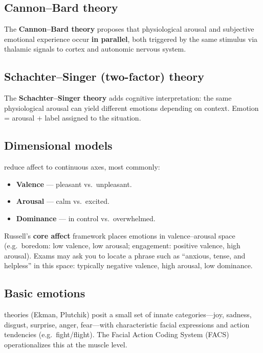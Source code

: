 
\subsection{Cannon--Bard theory}

The \textbf{Cannon--Bard theory} proposes that physiological arousal and subjective emotional experience occur \textbf{in parallel}, both triggered by the same stimulus via thalamic signals to cortex and autonomic nervous system.

\subsection{Schachter--Singer (two-factor) theory}

The \textbf{Schachter--Singer theory} adds cognitive interpretation: the same physiological arousal can yield different emotions depending on context. Emotion = arousal + label assigned to the situation.

\subsection{Dimensional models}

 reduce affect to continuous axes, most commonly:
\begin{itemize}
  \item \textbf{Valence} --- pleasant vs.\ unpleasant.
  \item \textbf{Arousal} --- calm vs.\ excited.
  \item \textbf{Dominance} --- in control vs.\ overwhelmed.
\end{itemize}

Russell's \textbf{core affect} framework places emotions in valence--arousal space (e.g.\ boredom: low valence, low arousal; engagement: positive valence, high arousal). Exams may ask you to locate a phrase such as ``anxious, tense, and helpless'' in this space: typically negative valence, high arousal, low dominance.

\subsection{Basic emotions}

 theories (Ekman, Plutchik) posit a small set of innate categories---joy, sadness, disgust, surprise, anger, fear---with characteristic facial expressions and action tendencies (e.g.\ fight/flight). The Facial Action Coding System (FACS) operationalizes this at the muscle level.

